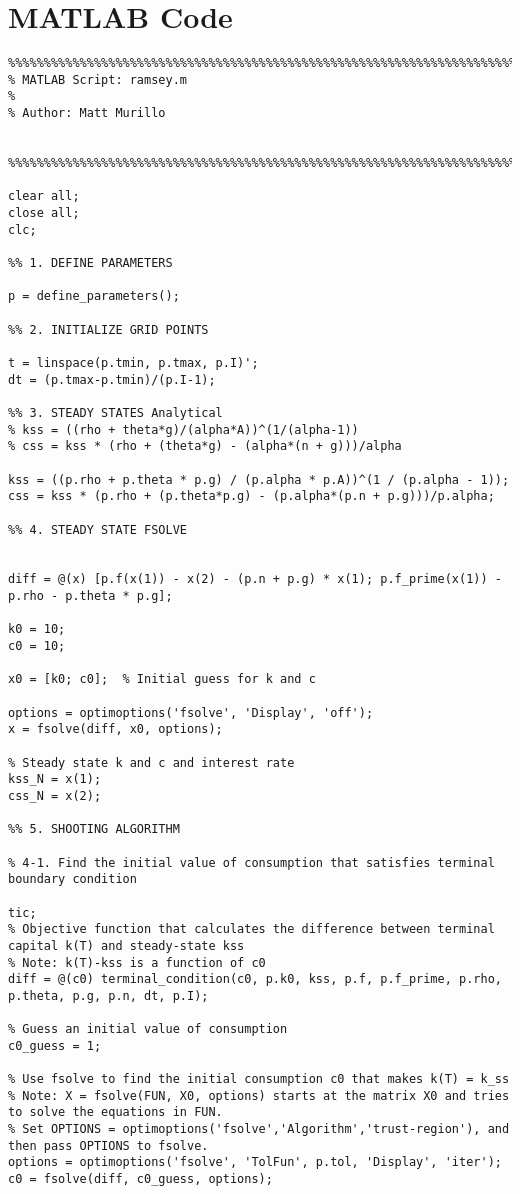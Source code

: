 \section*{MATLAB Code}
\begin{lstlisting}
%%%%%%%%%%%%%%%%%%%%%%%%%%%%%%%%%%%%%%%%%%%%%%%%%%%%%%%%%%%%%%%%%%%%%%%%%%%
% MATLAB Script: ramsey.m
%
% Author: Matt Murillo


%%%%%%%%%%%%%%%%%%%%%%%%%%%%%%%%%%%%%%%%%%%%%%%%%%%%%%%%%%%%%%%%%%%%%%%%%%%

clear all;
close all;
clc;

%% 1. DEFINE PARAMETERS

p = define_parameters();

%% 2. INITIALIZE GRID POINTS

t = linspace(p.tmin, p.tmax, p.I)';
dt = (p.tmax-p.tmin)/(p.I-1);

%% 3. STEADY STATES Analytical
% kss = ((rho + theta*g)/(alpha*A))^(1/(alpha-1))
% css = kss * (rho + (theta*g) - (alpha*(n + g)))/alpha

kss = ((p.rho + p.theta * p.g) / (p.alpha * p.A))^(1 / (p.alpha - 1));
css = kss * (p.rho + (p.theta*p.g) - (p.alpha*(p.n + p.g)))/p.alpha;

%% 4. STEADY STATE FSOLVE


diff = @(x) [p.f(x(1)) - x(2) - (p.n + p.g) * x(1); p.f_prime(x(1)) - p.rho - p.theta * p.g]; 

k0 = 10;
c0 = 10;

x0 = [k0; c0];  % Initial guess for k and c

options = optimoptions('fsolve', 'Display', 'off');
x = fsolve(diff, x0, options);

% Steady state k and c and interest rate
kss_N = x(1);
css_N = x(2);

%% 5. SHOOTING ALGORITHM

% 4-1. Find the initial value of consumption that satisfies terminal boundary condition

tic;
% Objective function that calculates the difference between terminal capital k(T) and steady-state kss
% Note: k(T)-kss is a function of c0
diff = @(c0) terminal_condition(c0, p.k0, kss, p.f, p.f_prime, p.rho, p.theta, p.g, p.n, dt, p.I);

% Guess an initial value of consumption
c0_guess = 1;

% Use fsolve to find the initial consumption c0 that makes k(T) = k_ss
% Note: X = fsolve(FUN, X0, options) starts at the matrix X0 and tries to solve the equations in FUN.
% Set OPTIONS = optimoptions('fsolve','Algorithm','trust-region'), and then pass OPTIONS to fsolve.
options = optimoptions('fsolve', 'TolFun', p.tol, 'Display', 'iter');
c0 = fsolve(diff, c0_guess, options);


\end{lstlisting}
